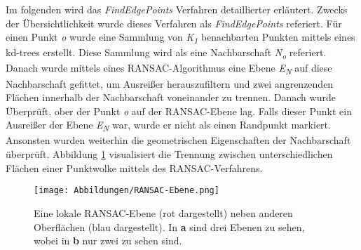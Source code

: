 Im folgenden wird das \textit{FindEdgePoints} Verfahren detaillierter erläutert. Zwecks der Übersichtlichkeit wurde dieses Verfahren als \textit{FindEdgePoints} referiert. Für einen Punkt \textit{o} wurde eine Sammlung von \textit{K\textsubscript{1}} benachbarten Punkten mittels eines kd-trees erstellt. Diese Sammlung wird als eine Nachbarschaft \textit{N\textsubscript{o}} referiert. Danach wurde mittels eines RANSAC-Algorithmus eine Ebene \textit{E\textsubscript{N}} auf diese Nachbarschaft gefittet, um Ausreißer herauszufiltern und zwei angrenzenden Flächen innerhalb der Nachbarschaft voneinander zu trennen. Danach wurde Überprüft, ober der Punkt \textit{o} auf der RANSAC-Ebene lag. Falls dieser Punkt ein Ausreißer der Ebene \textit{E\textsubscript{N}} war, wurde er nicht als einen Randpunkt markiert. Ansonsten wurden weiterhin die geometrischen Eigenschaften der Nachbarschaft überprüft. Abbildung \ref{RANSAC-Ebene} visualisiert die Trennung zwischen unterschiedlichen Flächen einer Punktwolke mittels des RANSAC-Verfahrens. 

\begin{figure}[h]
	\texttt{[image: Abbildungen/RANSAC-Ebene.png]}
	\centering
	\caption{Eine lokale RANSAC-Ebene (rot dargestellt) neben anderen Oberflächen (blau dargestellt). In \textbf{a} sind drei Ebenen zu sehen, wobei in \textbf{b} nur zwei zu sehen sind. \autocite{ni_edge_2016}}
	\label{RANSAC-Ebene}
\end{figure} 

